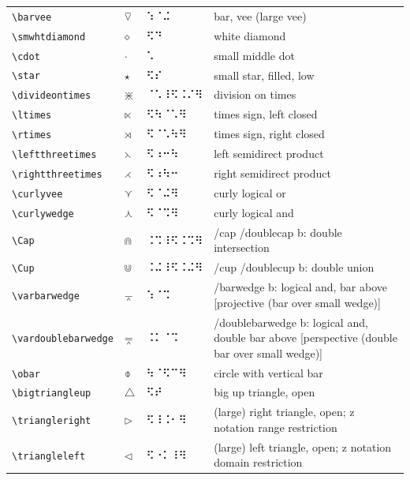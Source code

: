 \documentclass[oneside]{article}
\begin{document}
\begin{longtable}{llll}
\verb|\barvee| & $\barvee$ &  ⠱⠈⠬  & {bar, vee (large vee)} \\[2ex]
\verb|\smwhtdiamond| & $\smwhtdiamond$ &  ⠫⠙  & {white diamond} \\[2ex]
\verb|\cdot| & $\cdot$ &  ⠡  & {small middle dot} \\[2ex]
\verb|\star| & $\star$ &  ⠫⠎  & {small star, filled, low} \\[2ex]
\verb|\divideontimes| & $\divideontimes$ &  ⠈⠡⠸⠫⠨⠌⠻  & {division on times} \\[2ex]
\verb|\ltimes| & $\ltimes$ &  ⠫⠳⠈⠡⠻  & {times sign, left closed} \\[2ex]
\verb|\rtimes| & $\rtimes$ &  ⠫⠈⠡⠳⠻  & {times sign, right closed} \\[2ex]
\verb|\leftthreetimes| & $\leftthreetimes$ &  ⠫⠰⠒⠳  & {left semidirect product} \\[2ex]
\verb|\rightthreetimes| & $\rightthreetimes$ &  ⠫⠰⠳⠒  & {right semidirect product} \\[2ex]
\verb|\curlyvee| & $\curlyvee$ &  ⠫⠈⠬⠻  & {curly logical or} \\[2ex]
\verb|\curlywedge| & $\curlywedge$ &  ⠫⠈⠩⠻  & {curly logical and} \\[2ex]
\verb|\Cap| & $\Cap$ &  ⠨⠩⠸⠫⠨⠩⠻  & {/cap /doublecap b: double intersection} \\[2ex]
\verb|\Cup| & $\Cup$ &  ⠨⠬⠸⠫⠨⠬⠻  & {/cup /doublecup b: double union} \\[2ex]
\verb|\varbarwedge| & $\varbarwedge$ &  ⠱⠈⠩  & \begin{minipage}[t]{8cm}{/barwedge b: logical and, bar above [projective (bar over small wedge)]}
\end{minipage}\\[4ex]
\verb|\vardoublebarwedge| & $\vardoublebarwedge$ &  ⠨⠅⠈⠩  & \begin{minipage}[t]{8cm}{/doublebarwedge b: logical and, double bar above [perspective (double bar over small wedge)]}
\end{minipage}\\[4ex]
\verb|\obar| & $\obar$ &  ⠳⠈⠫⠉⠻  & {circle with vertical bar} \\[2ex]
\verb|\bigtriangleup| & $\bigtriangleup$ &  ⠫⠞  & {big up triangle, open} \\[2ex]
\verb|\triangleright| & $\triangleright$ &  ⠫⠸⠨⠂⠻  & {(large) right triangle, open; z notation range restriction} \\[2ex]
\verb|\triangleleft| & $\triangleleft$ &  ⠫⠐⠅⠸⠻  & {(large) left triangle, open; z notation domain restriction} \\[2ex]

\end{longtable}
\end{document}
